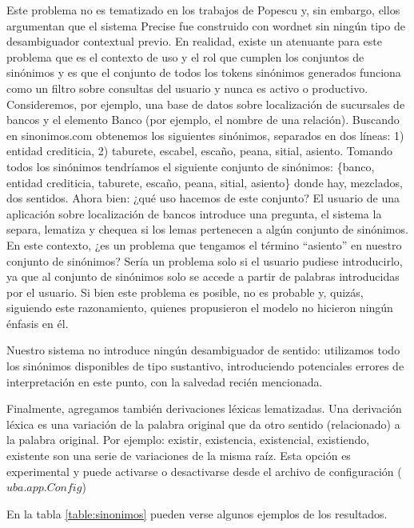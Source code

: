 Este problema no es tematizado en los trabajos de Popescu y, sin embargo, ellos argumentan que el sistema Precise fue construido con wordnet sin ningún tipo de desambiguador contextual previo.
En realidad, existe un atenuante para este problema que es el contexto de uso y el rol que cumplen los conjuntos de sinónimos y es que el conjunto de todos los tokens sinónimos generados funciona como un filtro sobre consultas del usuario y nunca es activo o productivo.
Consideremos, por ejemplo, una base de datos sobre localización de sucursales de bancos y el elemento Banco (por ejemplo, el nombre de una relación).
Buscando en sinonimos.com obtenemos los siguientes sinónimos, separados en dos líneas: 1) entidad crediticia, 2) taburete, escabel, escaño, peana, sitial, asiento. Tomando todos los sinónimos tendríamos el siguiente conjunto de sinónimos: \{banco, entidad crediticia, taburete, escaño, peana, sitial, asiento\} donde hay, mezclados, dos sentidos. Ahora bien: ¿qué uso hacemos de este conjunto? El usuario de una aplicación sobre localización de bancos introduce una pregunta, el sistema la separa, lematiza y chequea si los lemas pertenecen a algún conjunto de sinónimos. En este contexto, ¿es un problema que tengamos el término ``asiento'' en nuestro conjunto de sinónimos? Sería un problema solo si el usuario pudiese introducirlo, ya que al conjunto de sinónimos solo se accede a partir de palabras introducidas por el usuario. Si bien este problema es posible, no es probable y, quizás, siguiendo este razonamiento, quienes propusieron el modelo no hicieron ningún énfasis en él.

Nuestro sistema no introduce ningún desambiguador de sentido: utilizamos todo los sinónimos disponibles de tipo sustantivo, introduciendo potenciales errores de interpretación en este punto, con la salvedad recién mencionada.


Finalmente, agregamos también derivaciones léxicas lematizadas. Una derivación léxica es una variación de la palabra original que da otro sentido (relacionado) a la palabra original. Por ejemplo: existir, existencia, existencial, existiendo, existente son una serie de variaciones de la misma raíz.  Esta opción es experimental y puede activarse o desactivarse desde el archivo de configuración ($uba.app.Config$)

En la tabla \ref{table:sinonimos} pueden verse algunos ejemplos de los resultados.

